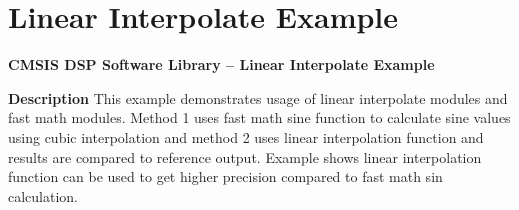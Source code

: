 \hypertarget{group___linear_interp_example}{\section{Linear Interpolate Example}
\label{group___linear_interp_example}
}
{\bfseries  C\-M\-S\-I\-S D\-S\-P Software Library -- Linear Interpolate Example }

{\bfseries  Description } This example demonstrates usage of linear interpolate modules and fast math modules. Method 1 uses fast math sine function to calculate sine values using cubic interpolation and method 2 uses linear interpolation function and results are compared to reference output. Example shows linear interpolation function can be used to get higher precision compared to fast math sin calculation.

